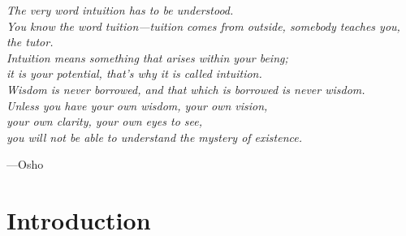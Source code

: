 \newpage


\vspace*{4cm}
\begin{center}
\textit{The very word intuition has to be understood. \\[5mm]
	You know the word tuition—tuition comes from outside, somebody teaches you, the tutor. \\[5mm]
	Intuition means something that arises within your being; \\[5mm]
	it is your potential, that’s why it is called intuition. \\[5mm]
	Wisdom is never borrowed, and that which is borrowed is never wisdom. \\[5mm]
	Unless you have your own wisdom, your own vision, \\[5mm]
	your own clarity, your own eyes to see, \\[5mm]
	you will not be able to understand the mystery of existence.}
\begin{flushright}
	---Osho
\end{flushright}
\end{center}

\newpage


\part*{Introduction}




